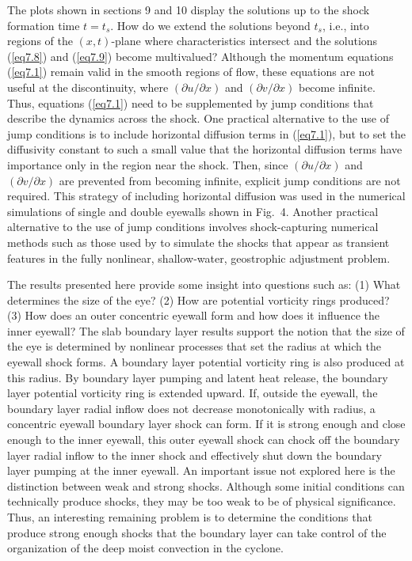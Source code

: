 \documentclass[10pt]{article}
\begin{document}
    The plots shown in sections 9 and 10 display the solutions up to the
shock formation time $t=t_s$. How do we extend the solutions beyond $t_s$,
i.e., into regions of the $(x,t)$-plane where characteristics intersect and
the solutions (\ref{eq7.8}) and (\ref{eq7.9}) become multivalued? Although
the momentum
equations (\ref{eq7.1}) remain valid in the smooth regions of flow, these
equations are not useful at the discontinuity, where $(\partial u/\partial x)$
and $(\partial v/\partial x)$ become infinite. Thus, equations (\ref{eq7.1}) need
to be supplemented by jump conditions that describe the dynamics across the shock.
One practical alternative to the use of jump conditions is to include horizontal
diffusion terms in (\ref{eq7.1}), but to set the diffusivity constant to such
a small value that the horizontal diffusion terms have importance only in the
region near the shock. Then, since $(\partial u/\partial x)$ and
$(\partial v/\partial x)$ are prevented from becoming infinite, explicit jump
conditions are not required. This strategy of including horizontal diffusion was
used in the numerical simulations of single and double eyewalls shown in Fig.~4.
Another practical alternative to the use of jump
conditions involves shock-capturing numerical methods such as those used by
\citet{kuo+polvani97} to simulate the shocks that appear as transient features
in the fully nonlinear, shallow-water, geostrophic adjustment problem.

     The results presented here provide some insight into questions such
as: (1) What determines the size of the eye? (2) How are potential vorticity
rings produced?  (3) How does an outer concentric eyewall form and how does it
influence the inner eyewall?
The slab boundary layer results support the notion that the size of the eye is
determined by nonlinear processes that set the radius at which the eyewall
shock forms.  A boundary layer potential vorticity ring is also produced at
this radius. By boundary layer pumping and latent heat release, the boundary
layer potential vorticity ring is extended upward.  If, outside the eyewall, the boundary layer
radial inflow does not decrease monotonically with radius, a concentric eyewall
boundary layer shock can form. If it is strong enough and close enough to the
inner eyewall, this outer eyewall shock can chock off the boundary layer radial
inflow to the inner shock and effectively shut down the boundary layer pumping
at the inner eyewall. An important issue not explored here is the distinction
between weak and strong shocks. Although some initial conditions can technically
produce shocks, they may be too weak to be of physical significance.
Thus, an interesting remaining problem is to determine the conditions
that produce strong enough shocks that the boundary layer can take
control of the organization of the deep moist convection in the cyclone.
\end{document}
